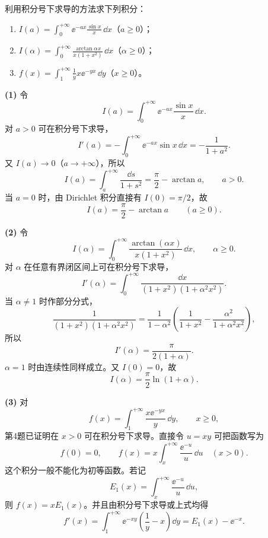\begin{xexercise}[8]
利用积分号下求导的方法求下列积分：
  \begin{enumerate}[label=(\arabic*)]
    \item $I(a)=\displaystyle\int_0^{+\infty}\ee^{-ax}\frac{\sin x}{x}\,\dd x$（$a\geqslant0$）；
    \item $I(\alpha)=\displaystyle\int_0^{+\infty}\frac{\arctan\alpha x}{x(1+x^2)}\,\dd x$（$\alpha\geqslant0$）；
    \item $f(x)=\displaystyle\int_1^{+\infty}\frac1y x\ee^{-yx}\,\dd y$（$x\geqslant0$）。
  \end{enumerate}
\end{xexercise}
\begin{xsolution}
\textbf{(1)} 令
\[
I(a)=\int_0^{+\infty}\ee^{-ax}\frac{\sin x}{x}\,\dd x.
\]
对 $a>0$ 可在积分号下求导，
\[
I'(a)=-\int_0^{+\infty}\ee^{-ax}\sin x\,\dd x=-\frac1{1+a^2}.
\]
又 $I(a)\to0$（$a\to+\infty$），所以
\[
I(a)=\int_a^{+\infty}\frac{\dd s}{1+s^2}
=\frac\pi2-\arctan a,
\qquad a>0.
\]
当 $a=0$ 时，由 Dirichlet 积分直接有 $I(0)=\pi/2$，故
\[
\boxed{I(a)=\frac\pi2-\arctan a\qquad(a\geqslant0)}.
\]

\textbf{(2)} 令
\[
I(\alpha)=\int_0^{+\infty}
\frac{\arctan(\alpha x)}{x(1+x^2)}\,\dd x,
\qquad \alpha\geqslant0.
\]
对 $\alpha$ 在任意有界闭区间上可在积分号下求导，
\[
I'(\alpha)=\int_0^{+\infty}
\frac{\dd x}{(1+x^2)(1+\alpha^2x^2)}.
\]
当 $\alpha\neq1$ 时作部分分式，
\[
\frac1{(1+x^2)(1+\alpha^2x^2)}
=\frac1{1-\alpha^2}\left(\frac1{1+x^2}-\frac{\alpha^2}{1+\alpha^2x^2}\right),
\]
所以
\[
I'(\alpha)=\frac\pi{2(1+\alpha)}.
\]
$\alpha=1$ 时由连续性同样成立。又 $I(0)=0$，故
\[
\boxed{I(\alpha)=\frac\pi2\ln(1+\alpha)}.
\]

\textbf{(3)} 对
\[
f(x)=\int_1^{+\infty}\frac{x\ee^{-yx}}y\,\dd y,
\qquad x\geqslant0,
\]
第4题已证明在 $x>0$ 可在积分号下求导。直接令 $u=xy$ 可把函数写为
\[
\boxed{
f(0)=0,
\qquad
f(x)=x\int_x^{+\infty}\frac{\ee^{-u}}u\,\dd u\quad(x>0).}
\]
这个积分一般不能化为初等函数。若记
\[
E_1(x)=\int_x^{+\infty}\frac{\ee^{-u}}u\,\dd u,
\]
则 $f(x)=xE_1(x)$。并且由积分号下求导或上式均得
\[
f'(x)=\int_1^{+\infty}\ee^{-xy}\left(\frac1y-x\right)\dd y
=E_1(x)-\ee^{-x}.
\]
\end{xsolution}


